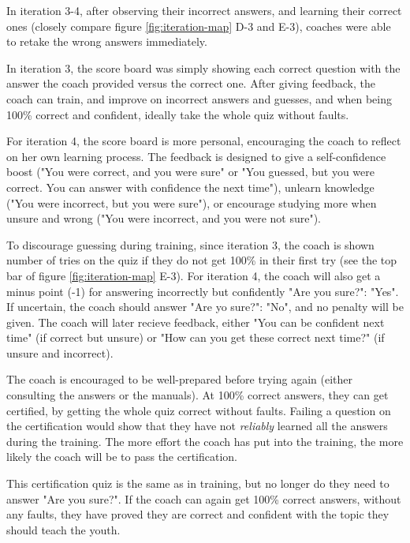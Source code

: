   In iteration 3-4, after observing their incorrect answers, and learning their correct ones (closely compare figure \ref{fig:iteration-map} D-3 and E-3), coaches were able to retake the wrong answers immediately.

  In iteration 3, the score board was simply showing each correct question with the answer the coach provided versus the correct one. After giving feedback, the coach can train, and improve on incorrect answers and guesses, and when being 100\% correct and confident, ideally take the whole quiz without faults.

  For iteration 4, the score board is more personal, encouraging the coach to reflect on her own learning process. The feedback is designed to give a self-confidence boost ("You were correct, and you were sure" or "You guessed, but you were correct. You can answer with confidence the next time"), unlearn knowledge ("You were incorrect, but you were sure"), or encourage studying more when unsure and wrong ("You were incorrect, and you were not sure").

  To discourage guessing during training, since iteration 3, the coach is shown number of tries on the quiz if they do not get 100\% in their first try (see the top bar of figure \ref{fig:iteration-map} E-3). For iteration 4, the coach will also get a minus point (-1) for answering incorrectly but confidently "Are you sure?": "Yes". If uncertain, the coach should answer "Are yo sure?": "No", and no penalty will be given. The coach will later recieve feedback, either "You can be confident next time" (if correct but unsure) or "How can you get these correct next time?" (if unsure and incorrect).

  The coach is encouraged to be well-prepared before trying again (either consulting the answers or the manuals). At 100\% correct answers, they can get certified, by getting the whole quiz correct without faults. Failing a question on the certification would show that they have not \textit{reliably} learned all the answers during the training. The more effort the coach has put into the training, the more likely the coach will be to pass the certification.


   This certification quiz is the same as in training, but no longer do they need to answer "Are you sure?". If the coach can again get 100\% correct answers, without any faults, they have proved they are correct and confident with the topic they should teach the youth.

